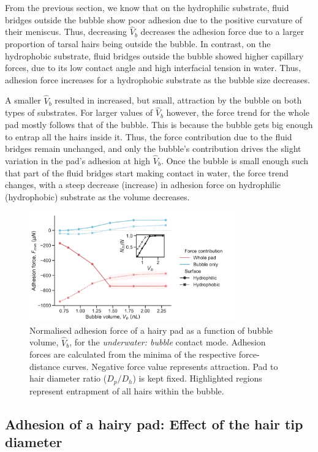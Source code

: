 \documentclass[vruler,JEB]{COB}%
\begin{document}
From the previous section, we know that on the hydrophilic substrate,
fluid bridges outside the bubble show poor adhesion due to the positive
curvature of their meniscus. Thus, decreasing $\hat{V}_{b}$ decreases
the adhesion force due to a larger proportion of tarsal hairs being outside
the bubble. In contrast, on the hydrophobic substrate, fluid bridges
outside the bubble showed higher capillary forces, due to its low contact
angle and high interfacial tension in water. Thus, adhesion force
increases for a hydrophobic substrate as the bubble size decreases. 

A smaller $\hat{V}_{b}$ resulted in increased, but small, attraction
by the bubble on both types of substrates. For larger values of $\hat{V}_{b}$
however, the force trend for the whole pad mostly follows that of
the bubble. This is because the bubble gets big enough to entrap all
the hairs inside it. Thus, the force contribution due to the fluid
bridges remain unchanged, and only the bubble's contribution drives
the slight variation in the pad's adhesion at high $\hat{V}_{b}$.
Once the bubble is small enough such that part of the fluid bridges
start making contact in water, the force trend changes, with a steep
decrease (increase) in adhesion force on hydrophilic (hydrophobic)
substrate as the volume decreases.

\begin{figure}
\includegraphics[width=3.5in]{Figure7-Model_effect_of_bubble_volume}\caption{\label{fig:Effect-of-bubble}Normalised adhesion force of a hairy
pad as a function of bubble volume, $\hat{V}_{b}$, for the
\emph{underwater: bubble} contact mode. Adhesion forces are calculated
from the minima of the respective force-distance curves. Negative
force value represents attraction. Pad to hair diameter ratio ($D_{p}/D_{h}$)
is kept fixed. Highlighted regions represent entrapment of all hairs
within the bubble.}
\end{figure}

\subsection{Adhesion of a hairy pad: Effect of the hair tip diameter}
\end{document}
